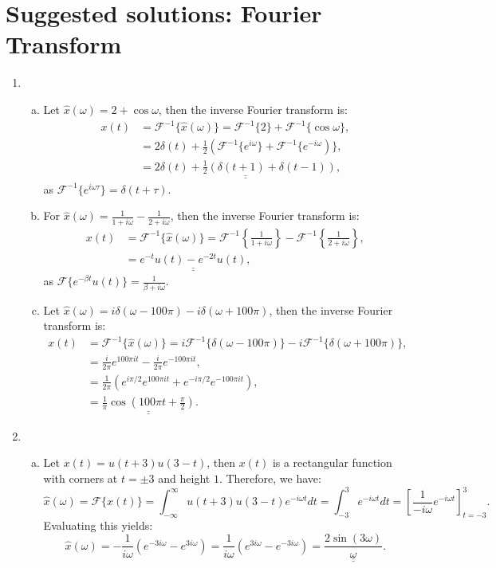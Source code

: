 \newpage
\section{Suggested solutions: Fourier Transform}
\begin{enumerate}

\item
\begin{enumerate}[a)]
\item Let $\hat{x}(\omega)=2+\cos\omega$, then the inverse Fourier transform is:
\begin{align*}
    x(t)&=\mathcal{F}^{-1}\{\hat{x}(\omega)\}=\mathcal{F}^{-1}\{2\}+\mathcal{F}^{-1}\{\cos\omega\}, \\
    &=2\delta(t)+\frac{1}{2}(\mathcal{F}^{-1}\{e^{i\omega}\}+\mathcal{F}^{-1}\{e^{-i\omega})\}, \\ 
    &=\underline{\underline{2\delta(t)+\frac{1}{2}(\delta(t+1)+\delta(t-1))}},
\end{align*}
as $\mathcal{F}^{-1}\{e^{i\omega\tau}\}=\delta(t+\tau)$.

\item For $\hat{x}(\omega)=\frac{1}{1+i\omega}-\frac{1}{2+i\omega}$, then the inverse Fourier transform is:
\begin{align*}
    x(t)&=\mathcal{F}^{-1}\{\hat{x}(\omega)\}=\mathcal{F}^{-1}\left\{\frac{1}{1+i\omega}\right\}-\mathcal{F}^{-1}\left\{\frac{1}{2+i\omega}\right\}, \\
    &=\underline{\underline{e^{-t}u(t)-e^{-2t}u(t)}},
\end{align*}
as $\mathcal{F}\{e^{-\beta t}u(t)\}=\frac{1}{\beta+i\omega}$. 

\item Let $\hat{x}(\omega)=i\delta(\omega-100\pi)-i\delta(\omega+100\pi)$, then the inverse Fourier transform is:
\begin{align*}
    x(t)&=\mathcal{F}^{-1}\{\hat{x}(\omega)\}=i\mathcal{F}^{-1}\{\delta(\omega-100\pi)\}-i\mathcal{F}^{-1}\{\delta(\omega+100\pi)\}, \\
    &=\frac{i}{2\pi}e^{100\pi it}-\frac{i}{2\pi}e^{-100\pi it}, \\
    &=\frac{1}{2\pi}(e^{i\pi/2}e^{100\pi i t}+e^{-i\pi/2}e^{-100\pi i t}), \\
    &=\underline{\underline{\frac{1}{\pi}\cos\left(100\pi t+\frac{\pi}{2}\right)}}.
\end{align*}
\end{enumerate}

\item   
\begin{enumerate}[a)]
\item Let $x(t)=u(t+3)u(3-t)$, then $x(t)$ is a rectangular function with corners at $t=\pm 3$ and height $1$. Therefore, we have:
$$\hat{x}(\omega)=\mathcal{F}\{x(t)\}=\int_{-\infty}^{\infty}u(t+3)u(3-t)e^{-i\omega t}dt=\int_{-3}^{3}e^{-i\omega t}dt=\left[\frac{1}{-i\omega}e^{-i\omega t}\right]_{t=-3}^{3}.$$
Evaluating this yields:
$$\hat{x}(\omega)=-\frac{1}{i\omega}(e^{-3i\omega}-e^{3i\omega})=\frac{1}{i\omega}(e^{3i\omega}-e^{-3i\omega})=\underline{\underline{\frac{2\sin(3\omega)}{\omega}}}.$$


\end{enumerate}
\end{enumerate}
